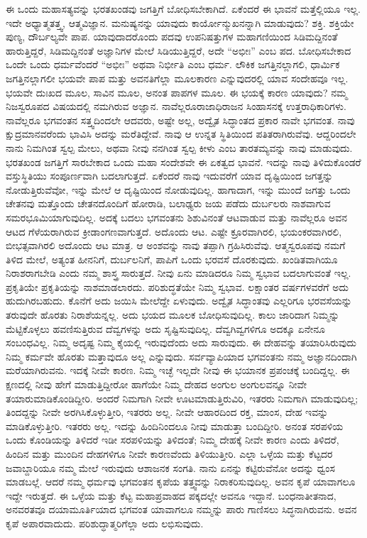 ಈ ಒಂದು ಮಹಾಸತ್ಯವನ್ನು ಭರತಖಂಡವು ಜಗತ್ತಿಗೆ ಬೋಧಿಸಬೇಕಾಗಿದೆ. ಏಕೆಂದರೆ ಈ ಭಾವನೆ ಮತ್ತೆಲ್ಲಿಯೂ ಇಲ್ಲ. ಇದೇ ಅಧ್ಯಾತ್ಮತತ್ತ್ವ, ಆತ್ಮವಿಜ್ಞಾನ. ಮನುಷ್ಯನನ್ನು ಯಾವುದು ಕಾರ್ಯೋನ್ಮುಖನನ್ನಾಗಿ ಮಾಡುವುದು? ಶಕ್ತಿ. ಶಕ್ತಿಯೇ ಪುಣ್ಯ, ದೌರ್ಬಲ್ಯವೇ ಪಾಪ. ಯಾವುದಾದರೊಂದು ಪದವು ಉಪನಿಷತ್ತುಗಳ ಮಹಾಗಣಿಯಿಂದ ಸಿಡಿಮದ್ದಿನಂತೆ ಹಾರುತ್ತಿದ್ದರೆ, ಸಿಡಿಮದ್ದಿನಂತೆ ಅಜ್ಞಾನಿಗಳ ಮೇಲೆ ಸಿಡಿಯುತ್ತಿದ್ದರೆ, ಅದೇ “ಅಭೀಃ” ಎಂಬ ಪದ. ಬೋಧಿಸಬೇಕಾದ ಒಂದೇ ಒಂದು ಧರ್ಮವೆಂದರೆ “ಅಭೀಃ” ಅಥವಾ ನಿರ್ಭೀತಿ ಎಂಬ ಧರ್ಮ. ಲೌಕಿಕ ಜಗತ್ತಿನಲ್ಲಾಗಲಿ, ಧಾರ್ಮಿಕ ಜಗತ್ತಿನಲ್ಲಾಗಲೀ ಭಯವೇ ಪಾಪ ಮತ್ತು ಅವನತಿಗೆಲ್ಲಾ ಮೂಲಕಾರಣ ಎನ್ನುವುದರಲ್ಲಿ ಯಾವ ಸಂದೇಹವೂ ಇಲ್ಲ. ಭಯವೇ ದುಃಖದ ಮೂಲ, ಸಾವಿನ ಮೂಲ, ಅನಂತ ಪಾಪಗಳ ಮೂಲ. ಈ ಭಯಕ್ಕೆ ಕಾರಣ ಯಾವುದು? ನಮ್ಮ ನಿಜಸ್ವರೂಪದ ವಿಷಯದಲ್ಲಿ ನಮಗಿರುವ ಅಜ್ಞಾನ. ನಾವೆಲ್ಲರೂ\break ರಾಜಾಧಿರಾಜನ ಸಿಂಹಾಸನಕ್ಕೆ ಉತ್ತರಾಧಿಕಾರಿಗಳು. ನಾವೆಲ್ಲರೂ ಭಗವಂತನ ಸತ್ತ್ವದಿಂದಲೇ ಆದವರು, ಅಷ್ಟೇ ಅಲ್ಲ, ಅದ್ವೈತ ಸಿದ್ಧಾಂತದ ಪ್ರಕಾರ ನಾವೇ ಭಗವಂತ. ನಾವು ಕ್ಷುದ್ರಮಾನವರೆಂದು ಭಾವಿಸಿ ಅದನ್ನು ಮರೆತಿದ್ದೇವೆ. ನಾವು ಆ ಉನ್ನತ ಸ್ಥಿತಿಯಿಂದ ಪತಿತರಾಗಿರುವೆವು. ಆದ್ದರಿಂದಲೇ ನಾನು ನಿಮಗಿಂತ ಸ್ವಲ್ಪ ಮೇಲು, ಅಥವಾ ನೀವು ನನಗಿಂತ ಸ್ವಲ್ಪ ಕೀಳು ಎಂಬ ತಾರತಮ್ಯವನ್ನು ನಾವು ಮಾಡುವುದು. ಭರತಖಂಡ ಜಗತ್ತಿಗೆ ಸಾರಬೇಕಾದ ಒಂದು ಮಹಾ ಸಂದೇಶವೇ ಈ ಏಕತ್ವದ ಭಾವನೆ. ಇದನ್ನು ನಾವು ತಿಳಿದುಕೊಂಡರೆ ವಸ್ತುಸ್ಥಿತಿಯು ಸಂಪೂರ್ಣವಾಗಿ ಬದಲಾಗುತ್ತದೆ. ಏಕೆಂದರೆ ನಾವು ಇದುವರೆಗೆ ಯಾವ ದೃಷ್ಟಿಯಿಂದ ಜಗತ್ತನ್ನು ನೋಡುತ್ತಿರುವೆವೋ, ಇನ್ನು ಮೇಲೆ ಆ ದೃಷ್ಟಿಯಿಂದ ನೋಡುವುದಿಲ್ಲ. ಹಾಗಾದಾಗ, ಇನ್ನು ಮುಂದೆ ಜಗತ್ತು ಒಂದು ಚೇತನವು ಮತ್ತೊಂದು ಚೇತನದೊಂದಿಗೆ ಹೋರಾಡಿ, ಬಲಾಢ್ಯರು ಜಯ ಪಡೆದು ದುರ್ಬಲರು ನಾಶವಾಗುವ ಸಮರಭೂಮಿಯಾಗುವುದಿಲ್ಲ. ಅದಕ್ಕೆ ಬದಲು ಭಗವಂತನು ಶಿಶುವಿನಂತೆ ಆಟವಾಡುವ ಮತ್ತು ನಾವೆಲ್ಲರೂ ಅವನ ಆಟದ ಗೆಳೆಯರಾಗಿರುವ ಕ್ರೀಡಾಂಗಣವಾಗುತ್ತದೆ. ಅದೊಂದು ಆಟ. ಎಷ್ಟೇ ಕ್ರೂರವಾಗಿರಲಿ, ಭಯಂಕರವಾಗಿರಲಿ, ಬೀಭತ್ಸವಾಗಿರಲಿ ಅದೊಂದು ಆಟ ಮಾತ್ರ. ಆ ಅಂಶವನ್ನು ನಾವು ತಪ್ಪಾಗಿ ಗ್ರಹಿಸಿರುವೆವು. ಆತ್ಮಸ್ವರೂಪವು ನಮಗೆ ತಿಳಿದ ಮೇಲೆ, ಅತ್ಯಂತ ಹೀನನಿಗೆ, ದುರ್ಬಲನಿಗೆ, ಪಾಪಿಗೆ ಒಂದು ಭರವಸೆ ದೊರಕುವುದು. ಖಂಡಿತವಾಗಿಯೂ ನಿರಾಶರಾಗಬೇಡಿ ಎಂದು ನಮ್ಮ ಶಾಸ್ತ್ರ ಸಾರುತ್ತದೆ. ನೀವು ಏನು ಮಾಡಿದರೂ ನಿಮ್ಮ ಸ್ವಭಾವ ಬದಲಾಗುವಂತೆ ಇಲ್ಲ. ಪ್ರಕೃತಿಯೇ ಪ್ರಕೃತಿಯನ್ನು ನಾಶಮಾಡಲಾರದು. ಪರಿಶುದ್ಧತೆಯೇ ನಿಮ್ಮ ಸ್ವಭಾವ. ಲಕ್ಷಾಂತರ ವರ್ಷಗಳವರೆಗೆ ಅದು ಹುದುಗಿರಬಹುದು. ಕೊನೆಗೆ ಅದು ಜಯಿಸಿ ಮೇಲೆದ್ದೇ ಏಳುವುದು. ಅದ್ವೈತ ಸಿದ್ಧಾಂತವು ಎಲ್ಲರಿಗೂ ಭರವಸೆಯನ್ನು ತರುವುದೇ ಹೊರತು ನಿರಾಶೆಯನ್ನಲ್ಲ. ಅದು ಭಯದ ಮೂಲಕ ಬೋಧಿಸುವುದಿಲ್ಲ. ಕಾಲು ಜಾರಿದಾಗ ನಿಮ್ಮನ್ನು ಮೆಟ್ಟಿಕೊಳ್ಳಲು ಹವಣಿಸುತ್ತಿರುವ ದೆವ್ವಗಳನ್ನು ಅದು ಸೃಷ್ಟಿಸುವುದಿಲ್ಲ. ದೆವ್ವಗಿವ್ವಗಳಿಗೂ ಅದಕ್ಕೂ ಏನೇನೂ ಸಂಬಂಧವಿಲ್ಲ. ನಿಮ್ಮ ಅದೃಷ್ಟ ನಿಮ್ಮ ಕೈಯಲ್ಲಿ ಇರುವುದೆಂದು ಅದು ಸಾರುವುದು. ಈ ದೇಹವನ್ನು ತಯಾರಿಸಿರುವುದು ನಿಮ್ಮ ಕರ್ಮವೇ ಹೊರತು ಮತ್ತಾವುದೂ ಅಲ್ಲ ಎನ್ನುವುದು. ಸರ್ವವ್ಯಾಪಿಯಾದ ಭಗವಂತನು ನಮ್ಮ ಅಜ್ಞಾನದಿಂದಾಗಿ ಮರೆಯಾಗಿರುವನು. ಇದಕ್ಕೆ ನೀವೇ ಕಾರಣ. ನಿಮ್ಮ ಇಚ್ಛೆ ಇಲ್ಲದೇ ನೀವು ಈ ಭಯಾನಕ ಪ್ರಪಂಚಕ್ಕೆ ಬಂದಿದ್ದಲ್ಲ. ಈ ಕ್ಷಣದಲ್ಲಿ ನೀವು ಹೇಗೆ ಮಾಡುತ್ತಿದ್ದೀರೋ ಹಾಗೆಯೇ ನಿಮ್ಮ ದೇಹದ ಅಂಗುಲ ಅಂಗುಲವನ್ನೂ ನೀವೇ ತಯಾರುಮಾಡಿಕೊಂಡಿದ್ದೀರಿ. ಅಂದರೆ ನಿಮಗಾಗಿ ನೀವೇ ಊಟಮಾಡುತ್ತಿರುವಿರಿ, ಇತರರು ನಿಮಗಾಗಿ ಮಾಡುವುದಿಲ್ಲ; ತಿಂದದ್ದನ್ನು ನೀವೇ ಅರಗಿಸಿಕೊಳ್ಳುತ್ತೀರಿ, ಇತರರು ಅಲ್ಲ. ನೀವೇ ಆಹಾರದಿಂದ ರಕ್ತ, ಮಾಂಸ, ದೇಹ ಇವನ್ನು ಮಾಡಿಕೊಳ್ಳುತ್ತೀರಿ. ಇತರರು ಅಲ್ಲ. ಇದನ್ನು ಹಿಂದಿನಿಂದಲೂ ನೀವು ಮಾಡುತ್ತಾ ಬಂದಿದ್ದೀರಿ. ಅನಂತ ಸರಪಳಿಯ ಒಂದು ಕೊಂಡಿಯನ್ನು ತಿಳಿದರೆ ಇಡೀ ಸರಪಳಿಯನ್ನು ತಿಳಿದಂತೆ; ನಿಮ್ಮ ದೇಹಕ್ಕೆ ನೀವೇ ಕಾರಣ ಎಂದು ತಿಳಿದರೆ, ಹಿಂದಿನ ಮತ್ತು ಮುಂದಿನ ದೇಹಗಳಿಗೂ ನೀವೇ ಕಾರಣವೆಂದು ತಿಳಿಯುತ್ತೀರಿ. ಎಲ್ಲಾ ಒಳ್ಳೆಯ ಮತ್ತು ಕೆಟ್ಟದರ ಜವಾಬ್ದಾರಿಯೂ ನಮ್ಮ ಮೇಲೆ ಇರುವುದು ಆಶಾಜನಕ ಸಂಗತಿ. ನಾನು ಏನನ್ನು ಕಟ್ಟಿರುವೆನೋ ಅದನ್ನು ಧ್ವಂಸ ಮಾಡಬಲ್ಲೆ. ಆದರೆ ನಮ್ಮ ಧರ್ಮವು ಭಗವಂತನ ಕೃಪೆಯ ತತ್ತ್ವವನ್ನು ನಿರಾಕರಿಸುವುದಿಲ್ಲ. ಅವನ ಕೃಪೆ ಯಾವಾಗಲೂ ಇದ್ದೇ ಇರುತ್ತದೆ. ಈ ಒಳ್ಳೆಯ ಮತ್ತು ಕೆಟ್ಟ ಮಹಾಪ್ರವಾಹದ ಪಕ್ಕದಲ್ಲೇ ಅವನೂ ಇದ್ದಾನೆ. ಬಂಧನಾತೀತನಾದ, ಅನವರತವೂ ದಯಾಮೂರ್ತಿಯಾದ ಭಗವಂತ ಯಾವಾಗಲೂ ನಮ್ಮನ್ನು ಪಾರು ಗಾಣಿಸಲು ಸಿದ್ಧನಾಗಿರುವನು. ಅವನ ಕೃಪೆ ಅಪಾರವಾದುದು. ಪರಿಶುದ್ಧಾತ್ಮರಿಗೆಲ್ಲಾ ಅದು ಲಭಿಸುವುದು.

